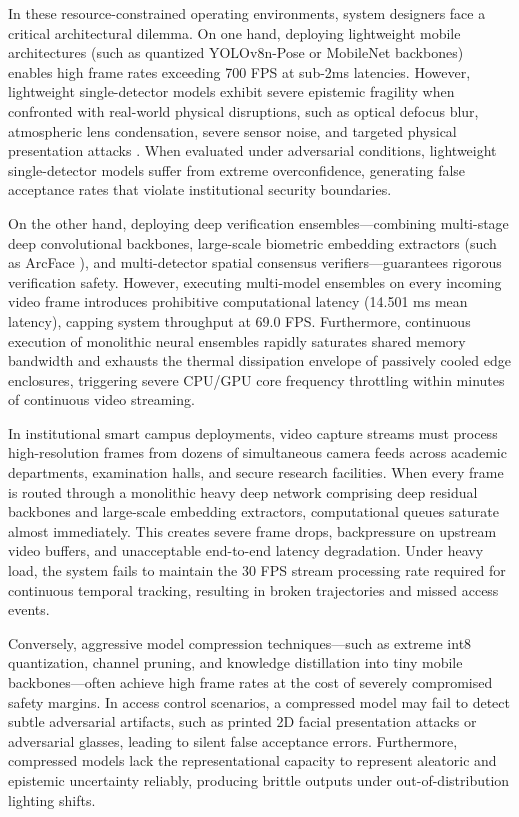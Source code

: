 \documentclass[conference]{IEEEtran}
\begin{document}
In these resource-constrained operating environments, system designers face a critical architectural dilemma. On one hand, deploying lightweight mobile architectures (such as quantized YOLOv8n-Pose or MobileNet backbones) enables high frame rates exceeding 700 FPS at sub-2ms latencies. However, lightweight single-detector models exhibit severe epistemic fragility when confronted with real-world physical disruptions, such as optical defocus blur, atmospheric lens condensation, severe sensor noise, and targeted physical presentation attacks \cite{b5, b6}. When evaluated under adversarial conditions, lightweight single-detector models suffer from extreme overconfidence, generating false acceptance rates that violate institutional security boundaries.

On the other hand, deploying deep verification ensembles—combining multi-stage deep convolutional backbones, large-scale biometric embedding extractors (such as ArcFace \cite{b22}), and multi-detector spatial consensus verifiers—guarantees rigorous verification safety. However, executing multi-model ensembles on every incoming video frame introduces prohibitive computational latency (14.501 ms mean latency), capping system throughput at 69.0 FPS. Furthermore, continuous execution of monolithic neural ensembles rapidly saturates shared memory bandwidth and exhausts the thermal dissipation envelope of passively cooled edge enclosures, triggering severe CPU/GPU core frequency throttling within minutes of continuous video streaming.

In institutional smart campus deployments, video capture streams must process high-resolution frames from dozens of simultaneous camera feeds across academic departments, examination halls, and secure research facilities. When every frame is routed through a monolithic heavy deep network comprising deep residual backbones and large-scale embedding extractors, computational queues saturate almost immediately. This creates severe frame drops, backpressure on upstream video buffers, and unacceptable end-to-end latency degradation. Under heavy load, the system fails to maintain the 30 FPS stream processing rate required for continuous temporal tracking, resulting in broken trajectories and missed access events.

Conversely, aggressive model compression techniques—such as extreme int8 quantization, channel pruning, and knowledge distillation into tiny mobile backbones—often achieve high frame rates at the cost of severely compromised safety margins. In access control scenarios, a compressed model may fail to detect subtle adversarial artifacts, such as printed 2D facial presentation attacks or adversarial glasses, leading to silent false acceptance errors. Furthermore, compressed models lack the representational capacity to represent aleatoric and epistemic uncertainty reliably, producing brittle outputs under out-of-distribution lighting shifts.
\end{document}
